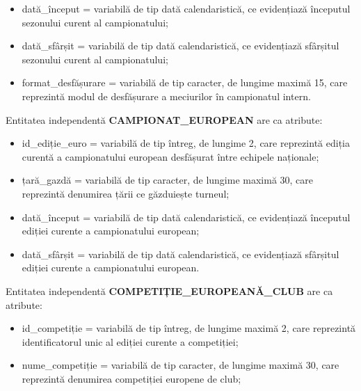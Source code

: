 \documentclass{article}
\begin{document}
\begin{spacing}{1.1}
\begin{itemize}
		\item dată\_început = variabilă de tip dată calendaristică, ce evidențiază începutul sezonului curent al campionatului; 
		
		\item dată\_sfârșit = variabilă de tip dată calendaristică, ce evidențiază sfârșitul sezonului curent al campionatului;
		
		\item format\_desfășurare =  variabilă de tip caracter, de lungime maximă 15, care reprezintă modul de desfășurare a meciurilor în campionatul intern.
	\end{itemize}
	
	\vspace{0.3cm}
	
	Entitatea independentă \textbf{CAMPIONAT\_EUROPEAN} are ca atribute:
	
	\begin{itemize}
		\item id\_ediție\_euro = variabilă de tip întreg, de lungime 2, care reprezintă ediția curentă a campionatului european desfășurat între echipele naționale;
		
		\item țară\_gazdă = variabilă de tip caracter, de lungime maximă 30, care reprezintă denumirea țării ce găzduiește turneul; 
		
		\item dată\_început = variabilă de tip dată calendaristică, ce evidențiază începutul ediției curente a campionatului european;
		
		\item dată\_sfârșit = variabilă de tip dată calendaristică, ce evidențiază sfârșitul ediției curente a campionatului european.
	\end{itemize}
	
	\vspace{0.3cm}
	
	Entitatea independentă \textbf{COMPETIȚIE\_EUROPEANĂ\_CLUB} are ca atribute:
	
	\begin{itemize}
		\item id\_competiție = variabilă de tip întreg, de lungime maximă 2, care reprezintă identificatorul unic al ediției curente a competiției;
		
		\item nume\_competiție = variabilă de tip caracter, de lungime maximă 30, care reprezintă denumirea competiției europene de club;
		

\end{itemize}
\end{spacing}
\end{document}
